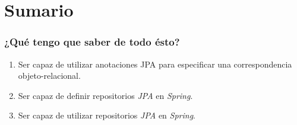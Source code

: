 \documentclass[a4paper,slidestop,xcolor=pst,blue]{beamer}
\begin{document}

\section{Sumario}

\begin{frame}[c]
    \frametitle{¿Qué tengo que saber de todo ésto?}
    \begin{enumerate}[<+->]
        \item Ser capaz de utilizar anotaciones JPA para especificar una correspondencia objeto-relacional.
        \item Ser capaz de definir repositorios \emph{JPA} en \emph{Spring}.
        \item Ser capaz de utilizar repositorios \emph{JPA} en \emph{Spring}.
    \end{enumerate}
\end{frame}
\end{document}

